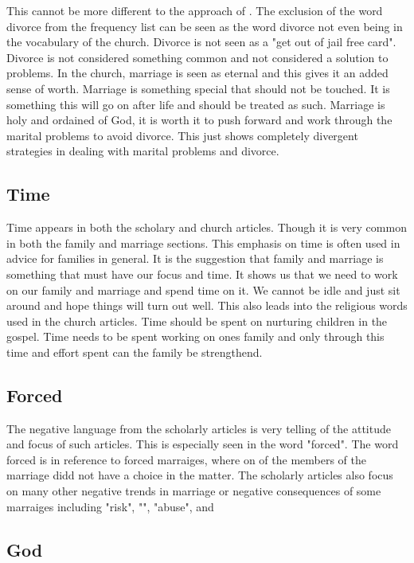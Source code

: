 \documentclass[twocolumn]{article}
\begin{document}
This cannot be more different to the approach of \church. The exclusion of the word divorce from the frequency list can be seen as the word divorce not even being in the vocabulary of the church. Divorce is not seen as a "get out of jail free card". Divorce is not considered something common and not considered a solution to problems. In the church, marriage is seen as eternal and this gives it an added sense of worth. Marriage is something special that should not be touched. It is something this will go on after life and should be treated as such. Marriage is holy and ordained of God, it is worth it to push forward and work through the marital problems to avoid divorce. This just shows completely divergent strategies in dealing with marital problems and divorce.

\subsection{Time}

Time appears in both the scholary and church articles. Though it is very common in both the family and marriage sections. This emphasis on time is often used in advice for families in general. It is the suggestion that family and marriage is something that must have our focus and time. It shows us that we need to work on our family and marriage and spend time on it. We cannot be idle and just sit around and hope things will turn out well. This also leads into the religious words used in the church articles. Time should be spent on nurturing children in the gospel. Time needs to be spent working on ones family and only through this time and effort spent can the family be strengthend.

\subsection{Forced}


The negative language from the scholarly articles is very telling of the attitude and focus of such articles. This is especially seen in the word "forced". The word forced is in reference to forced marraiges, where on of the members of the marriage didd not have a choice in the matter.
The scholarly articles also focus on many other negative trends in marriage or negative consequences of some marraiges including "risk", "", "abuse", and

\subsection{God}
\end{document}
